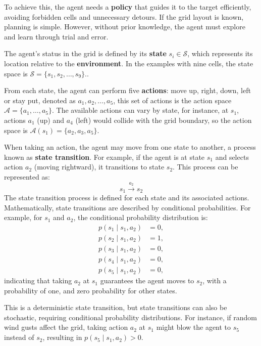 To achieve this, the agent needs a \textbf{policy} that guides it to the target
efficiently, avoiding forbidden cells and unnecessary detours.
If the grid layout is known, planning is simple.
However, without prior knowledge, the agent must explore and learn
through trial and error.

The agent's status in the grid is defined by its \textbf{state}
\( s_i \in \mathcal{S} \), which represents its location relative
to the \textbf{environment}.
In the examples with nine cells, the state space is
\( \mathcal{S} = \{s_1, s_2, \ldots, s_9\} \)..

From each state, the agent can perform five \textbf{actions}: move up,
right, down, left or stay put, denoted as \( a_1, a_2, \ldots, a_5 \),
this set of actions is the action space
\( \mathcal{A} = \{a_1, \ldots, a_5\} \).
The available actions can vary by state, for instance,
at \( s_1 \), actions \( a_1 \) (up) and \( a_4 \) (left) would collide
with the grid boundary, so the action space is
\( \mathcal{A}(s_1) = \{a_2, a_3, a_5\} \).

When taking an action, the agent may move from one state to another,
a process known as \textbf{state transition}. For example,
if the agent is at state \( s_1 \) and selects action
\( a_2 \) (moving rightward), it transitions to state
\( s_2 \). This process can be represented as:
\[ s_1 \overset{a_2}{\longrightarrow} s_2 \]
The state transition process is defined for each
state and its associated actions. Mathematically, state transitions
are described by conditional probabilities.
For example, for \( s_1 \) and \( a_2 \),
the conditional probability distribution is:
\[
\begin{aligned}
p(s_1 \mid s_1, a_2) &= 0, \\
p(s_2 \mid s_1, a_2) &= 1, \\
p(s_3 \mid s_1, a_2) &= 0, \\
p(s_4 \mid s_1, a_2) &= 0, \\
p(s_5 \mid s_1, a_2) &= 0,
\end{aligned}
\]
indicating that taking \( a_2 \) at \( s_1 \) guarantees
the agent moves to \( s_2 \), with a probability of one,
and zero probability for other states.

This is a deterministic state transition,
but state transitions can also be stochastic,
requiring conditional probability distributions.
For instance, if random wind gusts affect the grid,
taking action \( a_2 \) at \( s_1 \) might blow the agent to \( s_5 \)
instead of \( s_2 \), resulting in \( p(s_5 \mid s_1, a_2) > 0 \).

